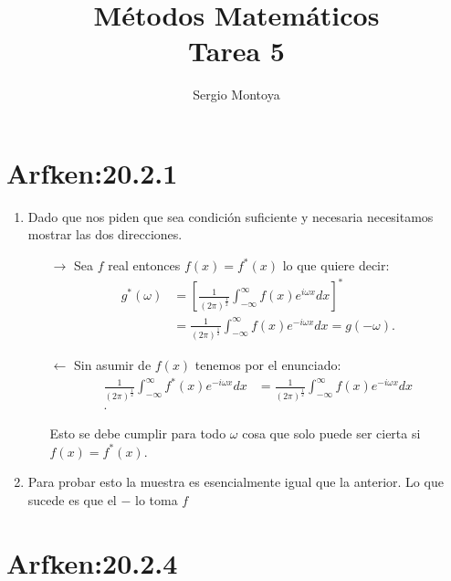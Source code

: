 \documentclass{report}
\title{\Huge{Métodos Matemáticos}\\Tarea 5}
\author{\huge{Sergio Montoya}}
\date{}
\begin{document}
\maketitle
\newpage%
\tableofcontents
\pagebreak

\chapter{Arfken:20.2.1}

\begin{enumerate}
  \item Dado que nos piden que sea condición suficiente y necesaria necesitamos mostrar las dos direcciones.
    \begin{enumerate}
      \item[$\to$] Sea $f$ real entonces $f\left( x \right) = f^{*}\left( x \right) $ lo que quiere decir:
	\begin{align*}
	  g^{*}\left( \omega \right) &= \left[ \frac{1}{\left( 2\pi \right)^{\frac{1}{2}}}\int_{-\infty}^{\infty} f\left( x \right) e^{i\omega x}dx \right]^{*} \\
				     &= \frac{1}{\left( 2\pi \right)^{\frac{1}{2}}} \int_{-\infty}^{\infty}f\left( x \right) e^{-i\omega x}dx = g\left( -\omega \right)
	.\end{align*}
      \item[$\leftarrow$] Sin asumir de $f\left( x \right) $ tenemos por el enunciado:
	\begin{align*}
	  \frac{1}{\left( 2\pi \right)^{\frac{1}{2}} } \int_{-\infty}^{\infty}f^{*}\left( x \right) e^{-i\omega x}dx &= \frac{1}{\left( 2\pi \right)^{\frac{1}{2}}} \int_{-\infty}^{\infty} f\left( x \right) e^{-i \omega x} dx \\
	.\end{align*}

	Esto se debe cumplir para todo $\omega$ cosa que solo puede ser cierta si $f\left( x \right) = f^{*}\left( x \right) $.
    \end{enumerate}

  \item Para probar esto la muestra es esencialmente igual que la anterior. Lo que sucede es que el $-$ lo toma $f$
\end{enumerate}

\chapter{Arfken:20.2.4}
\end{document}
